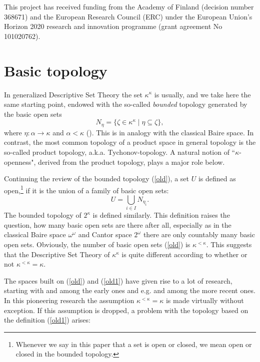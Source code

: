 \documentclass[12pt,a4paper]{amsart}
\theoremstyle{definition}
\theoremstyle{remark}
\renewcommand{\mid}{\mathrel{|}\allowbreak}
\begin{document}
This project has received funding from the Academy of Finland (decision number 368671) and the European Research Council (ERC) under the
European Union’s Horizon 2020 research and innovation programme (grant agreement No
101020762).

\section{Basic  topology}

In generalized Descriptive Set Theory the set $\kappa^\kappa$ is usually, and we take here the same starting point,  endowed with the so-called \emph{bounded} topology generated by the basic open sets 
\begin{equation}\label{old}
N_\eta=\{\zeta\in \kappa^\kappa\mid\eta\subseteq \zeta\},
\end{equation} where $\eta:\alpha\rightarrow \kappa$ and  $\alpha<\kappa$   (\cite{MR1110032,MR1242054,MR3235820,MR4409720}). This is in analogy with the classical Baire  space. In contrast, the most common topology of a product space in general topology is the so-called product  topology, a.k.a. Tychonov-topology. A natural notion of ``$\kappa$-openness", derived from  the product topology, plays a major role below.

Continuing the review of the bounded topology (\ref{old}), a set $U$ is  defined as open,\footnote{Whenever we say in this paper that a set is open or closed, we mean open or closed in the bounded topology.}   if it is the union of a family of basic open sets:
\begin{equation}\label{old1}
U=\bigcup_{i\in I}N_{\eta_i}.
\end{equation} The bounded topology of $2^\kappa$ is defined similarly. This definition raises the question, how many basic open sets are there after all, especially as in the classical Baire space $\omega^\omega$ and Cantor space $2^\omega$ there are only countably many basic open sets. Obviously, the number of basic open sets (\ref{old}) is $\kappa^{<\kappa}$. This suggests that the Descriptive Set Theory of $\kappa^\kappa$  is quite different according to whether or not $\kappa^{<\kappa}=\kappa$. 

The  spaces built on (\ref{old}) and (\ref{old1}) have given rise to a lot of research, starting with \cite{MR1110032} and \cite{MR1242054} among the early ones and e.g. 
\cite{MR3235820} and \cite{MR4409720} among the more recent ones.  In this pioneering research the assumption $\kappa^{<\kappa}=\kappa$ is made virtually without exception. If this assumption is dropped, a problem with  the topology based on the definition (\ref{old1}) arises:
\end{document}

